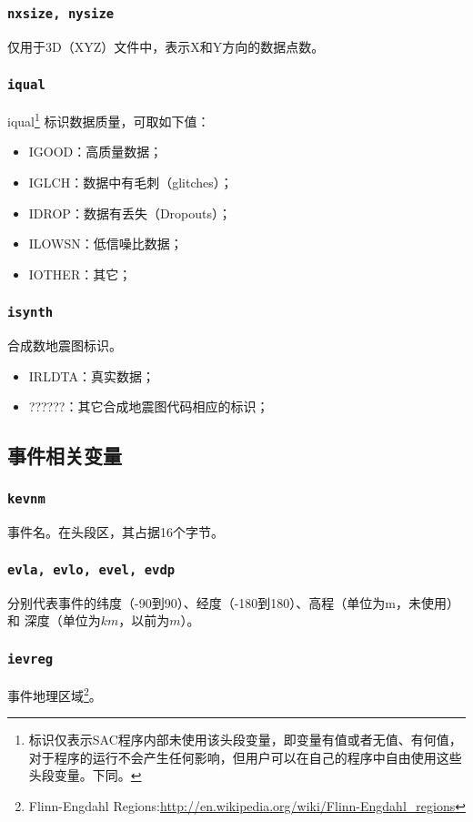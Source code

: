 \subsubsection{\texttt{nxsize, nysize}}
仅用于3D（XYZ）文件中，表示X和Y方向的数据点数。

\subsubsection{\texttt{iqual}\dag}
iqual\footnote{\dag 标识仅表示SAC程序内部未使用该头段变量，即变量有值或者无值、有何值，
对于程序的运行不会产生任何影响，但用户可以在自己的程序中自由使用这些头段变量。下同。
}
标识数据质量，可取如下值：
\begin{itemize}
\ttfamily
\item IGOOD：高质量数据；
\item IGLCH：数据中有毛刺（glitches）；
\item IDROP：数据有丢失（Dropouts）；
\item ILOWSN：低信噪比数据；
\item IOTHER：其它；
\end{itemize}

\subsubsection{\texttt{isynth}\dag}
合成数地震图标识。
\begin{itemize}
\ttfamily
\item IRLDTA：真实数据；
\item ??????：其它合成地震图代码相应的标识；
\end{itemize}

\subsection{事件相关变量}
\subsubsection{\texttt{kevnm}}
事件名。在头段区，其占据16个字节。

\subsubsection{\texttt{evla, evlo, evel, evdp}}
分别代表事件的纬度（-90到90）、经度（-180到180）、高程（单位为m，未使用）和
深度（单位为$km$，以前为$m$）。

\subsubsection{\texttt{ievreg}\dag}
事件地理区域\footnote{Flinn-Engdahl Regions:\url{http://en.wikipedia.org/wiki/Flinn-Engdahl_regions}}。

